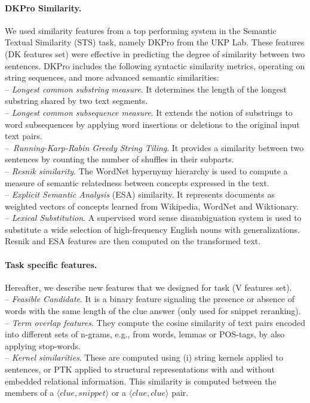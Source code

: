 \documentclass{wileysev}
\begin{document}
\paragraph{DKPro Similarity.}
We used similarity features from a top performing system in the Semantic Textual Similarity (STS) task, namely DKPro from the UKP Lab. These features (DK features set) were effective in predicting the degree of similarity between two sentences. DKPro includes the following syntactic similarity metrics, operating on string sequences, and more advanced semantic similarities:\\
-- \emph{Longest common substring measure}. It determines the length of the longest substring shared by two text segments.\\
-- \emph{Longest common subsequence measure}. It extends the notion of substrings to word subsequences by applying word insertions or deletions to the original input text pairs.\\
\mbox{-- }\emph{Running-Karp-Rabin Greedy String Tiling}. It provides a similarity between two sentences by counting the number of shuffles in their subparts.\\
-- \emph{Resnik similarity}. The WordNet hypernymy hierarchy is used to compute a measure of semantic relatedness between concepts expressed in the text.\\
-- \emph{Explicit Semantic Analysis} (ESA) similarity. It represents  documents as weighted vectors of concepts learned from Wikipedia, WordNet and Wiktionary.\\
-- \emph{Lexical Substitution}. A supervised word sense disambiguation system is used to substitute a wide selection of high-frequency English nouns with generalizations. Resnik and ESA features are then computed on the transformed text.

\paragraph{Task specific features.}
Hereafter, we describe new features that we designed for task (V features set).\\
-- \emph{Feasible Candidate}. It is a binary feature signaling the presence or absence of words with the same length of the clue answer (only used for snippet reranking).\\
-- \emph{Term overlap features}. They compute the cosine similarity of text pairs encoded into different sets of n-grams, e.g., from words, lemmas or POS-tags, by also applying stop-words. \\
-- \emph{Kernel similarities}. These are computed using (i) string kernels applied to sentences, or PTK applied to structural representations with and without embedded relational information. This similarity is computed between the members of a $\langle clue, snippet \rangle$ or a $\langle clue, clue \rangle$ pair.
 
\end{document}
